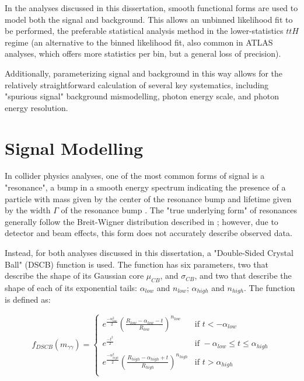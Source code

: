 In the analyses discussed in this dissertation, smooth functional forms are used to model both the signal and background. This allows an unbinned likelihood fit to be performed, the preferable statistical analysis method in the lower-statistics $ttH$ regime (an alternative to the binned likelihood fit, also common in ATLAS analyses, which offers more statistics per bin, but a general loss of precision). 

Additionally, parameterizing signal and background in this way allows for the relatively straightforward calculation of several key systematics, including "spurious signal" background mismodelling, photon energy scale, and photon energy resolution.

\section{Signal Modelling} \label{sec:example_section} 

In collider physics analyses, one of the most common forms of signal is a "resonance", a bump in a smooth energy spectrum indicating the presence of a particle with mass given by the center of the resonance bump and lifetime given by the width $\Gamma$ of the resonance bump \cite{Peskin}. The "true underlying form" of resonances generally follow the Breit-Wigner distribution described in \cite{SlowNeutrons}; however, due to detector and beam effects, this form does not accurately describe observed data.

Instead, for both analyses discussed in this dissertation, a "Double-Sided Crystal Ball" (DSCB) function \cite{CB}\cite{DSCB} is used. The function has six parameters, two that describe the shape of its Gaussian core $\mu_{CB}$, and $\sigma_{CB}$, and two that describe the shape of each of its exponential tails: $\alpha_{low}$ and $n_{low}$; $\alpha_{high}$ and $n_{high}$. The function is defined as:

\[f_{DSCB}(m_{\gamma \gamma}) = \begin{cases} 
      e^{\frac{-{\alpha_{low}^{2}}}{2}} (\frac{R_{low}-\alpha_{low}-t}{R_{low}})^{n_{low}} & \mbox{if } t < -\alpha_{low} \\
      e^{\frac{-t^{2}}{2}} & \mbox{if } -\alpha_{low} \leq t \leq \alpha_{high} \\
      e^{\frac{-{\alpha_{high}^{2}}}{2}} (\frac{R_{high}-\alpha_{high}+t}{R_{high}})^{n_{high}} & \mbox{if } t > \alpha_{high} \\
   \end{cases}
\]

